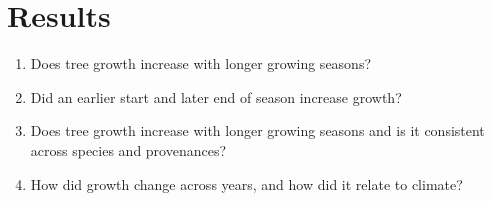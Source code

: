 \documentclass{article}\usepackage[]{graphicx}\usepackage[]{xcolor}
\begin{document}
\clearpage
\section*{Results}
\begin{enumerate}
\item Does tree growth increase with longer growing seasons?
\item Did an earlier start and later end of season increase growth? 
\item Does tree growth increase with longer growing seasons and is it consistent across species and provenances?
\item How did growth change across years, and how did it relate to climate? \\
\end{enumerate}
\end{document}
